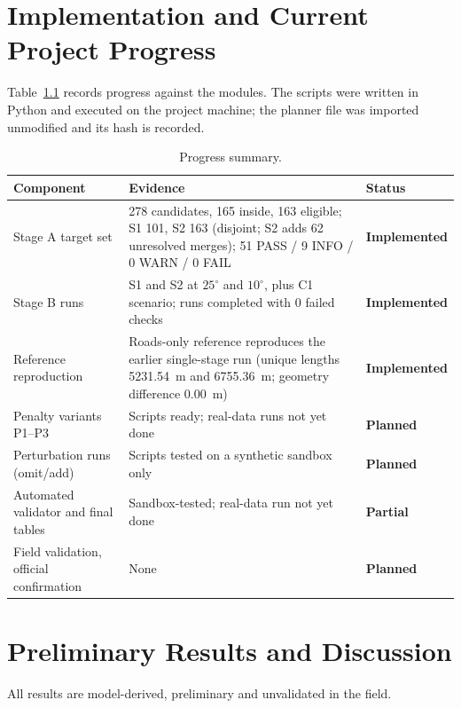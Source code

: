 \documentclass[12pt,a4paper]{report}
\newcommand{\planned}{\textbf{Planned}}
\newcommand{\partialS}{\textbf{Partial}}
\newcommand{\impl}{\textbf{Implemented}}
\begin{document}
\chapter{Implementation and Current Project Progress}
Table~\ref{tab:progress} records progress against the modules. The scripts were written in Python and executed on the project machine; the planner file was imported unmodified and its hash is recorded.

\begin{table}[ht]\centering\small
\caption{Progress summary.}\label{tab:progress}
\begin{tabularx}{\textwidth}{@{}p{4.2cm}Xp{2.6cm}@{}}\toprule
Component & Evidence & Status\\\midrule
Stage A target set & 278 candidates, 165 inside, 163 eligible; S1 101, S2 163 (disjoint; S2 adds 62 unresolved merges); 51 PASS / 9 INFO / 0 WARN / 0 FAIL & \impl\\
Stage B runs & S1 and S2 at $25^{\circ}$ and $10^{\circ}$, plus C1 scenario; runs completed with 0 failed checks & \impl\\
Reference reproduction & Roads-only reference reproduces the earlier single-stage run (unique lengths 5231.54~m and 6755.36~m; geometry difference 0.00~m) & \impl\\
Penalty variants P1--P3 & Scripts ready; real-data runs not yet done & \planned\\
Perturbation runs (omit/add) & Scripts tested on a synthetic sandbox only & \planned\\
Automated validator and final tables & Sandbox-tested; real-data run not yet done & \partialS\\
Field validation, official confirmation & None & \planned\\\bottomrule
\end{tabularx}
\end{table}

\chapter{Preliminary Results and Discussion}
All results are model-derived, preliminary and unvalidated in the field.
\end{document}
